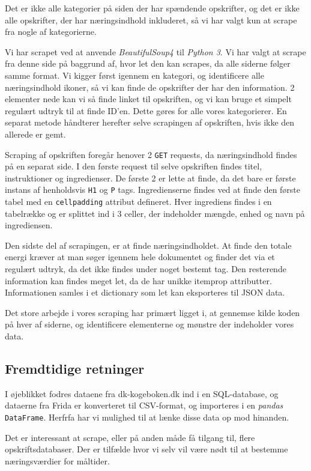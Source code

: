 \documentclass[a4paper,]{article}
\begin{document}
Det er ikke alle kategorier på siden der har spændende opskrifter, og det er ikke alle opskrifter, der har næringsindhold inkluderet, så vi har valgt kun at scrape fra nogle af kategorierne. 

Vi har scrapet ved at anvende \textit{BeautifulSoup4} til
\textit{Python 3}. Vi har valgt at scrape fra denne side på baggrund
af, hvor let den kan scrapes, da alle siderne følger samme format. Vi
kigger først igennem en kategori, og identificere alle næringsindhold
ikoner, så vi kan finde de opskrifter der har den information. 2
elementer nede kan vi så finde linket til opskriften, og vi kan bruge
et simpelt regulært udtryk til at finde ID’en. Dette gøres for alle
vores kategorierer. En separat metode håndterer herefter selve
scrapingen af opskriften, hvis ikke den allerede er gemt.

Scraping af opskriften foregår henover 2 \texttt{GET} requests, da
næringsindhold findes på en separat side. I den første request til
selve opskriften findes titel, instruktioner og ingredienser. De
første 2 er lette at finde, da det bare er første instans af
henholdsvis \texttt{H1} og \texttt{P} tags. Ingredienserne findes ved
at finde den første tabel med en \texttt{cellpadding} attribut
defineret. Hver ingrediens findes i en tabelrække og er splittet ind i
3 celler, der indeholder mængde, enhed og navn på ingrediensen.

Den sidste del af scrapingen, er at finde næringsindholdet. At finde
den totale energi kræver at man søger igennem hele dokumentet og
finder det via et regulært udtryk, da det ikke findes under noget
bestemt tag. Den resterende information kan findes meget let, da de
har unikke itemprop attributter. Informationen samles i et dictionary
som let kan eksporteres til JSON data.

Det store arbejde i vores scraping har primært ligget i, at gennemse
kilde koden på hver af siderne, og identificere elementerne og mønstre
der indeholder vores data.

\subsection{Fremdtidige retninger}

I øjeblikket fodres dataene fra dk-kogeboken.dk ind i en SQL-database,
og dataerne fra Frida er konverteret til CSV-format, og importeres i
en \textit{pandas} \texttt{DataFrame}.  Herfrfa har vi mulighed til at
lænke disse data op mod hinanden.

Det er interessant at scrape, eller på anden måde få tilgang til, flere
opskriftsdatabaser.  Der er tilfælde hvor vi selv vil være nødt til
at bestemme næringsværdier for måltider.
\end{document}
